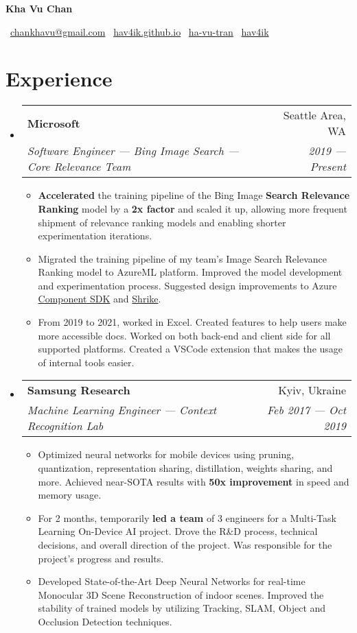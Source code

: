 \documentclass[letterpaper,11pt]{article}
\makeatletter
\newcommand{\resumeItem}[1]{
  \item[--]\small{
    {#1 \vspace{-2pt}}
  }
}
\newcommand{\resumeSubheading}[4]{
  \vspace{-1pt}\item
    \begin{tabular*}{0.97\textwidth}{l@{\extracolsep{\fill}}r}
      \textbf{#1} & #2 \\
      \textit{\small#3} & \textit{\small #4} \\
    \end{tabular*}\vspace{-5pt}
}
\newcommand{\resumeSubHeadingListStart}{\begin{itemize}[leftmargin=*]}
\newcommand{\resumeSubHeadingListEnd}{\end{itemize}}
\newcommand{\resumeItemListStart}{\begin{itemize}[leftmargin=*]}
\newcommand{\resumeItemListEnd}{\end{itemize}\vspace{-5pt}}
\makeatother
\begin{document}


\centerline{\textbf{{\LARGE Kha Vu Chan}}}\medskip
\centerline{
\faEnvelope \, \href{mailto:chankhavu@gmail.com}{chankhavu@gmail.com} \quad
\faLink \, \href{https://hav4ik.github.io/}{hav4ik.github.io} \quad
\faLinkedinSquare \, \href{https://www.linkedin.com/in/ha-vu-tran/}{ha-vu-tran} \quad
\faGithub \, \href{https://github.com/hav4ik}{hav4ik}
}


\section{Experience}
  \resumeSubHeadingListStart

    \resumeSubheading
      {Microsoft}{Seattle Area, WA}
      {Software Engineer --- Bing Image Search --- Core Relevance Team}{2019 --- Present}
      \resumeItemListStart
        \resumeItem{{\bf Accelerated} the training pipeline of the Bing Image {\bf Search Relevance Ranking} model by a {\bf 2x factor} and scaled it up, allowing more frequent shipment of relevance ranking models and enabling shorter experimentation iterations.}
        \resumeItem{Migrated the training pipeline of my team's Image Search Relevance Ranking model to AzureML platform. Improved the model development and experimentation process. Suggested design improvements to Azure \href{https://componentsdk.z22.web.core.windows.net/}{Component SDK} and \href{https://github.com/Azure/shrike}{Shrike}.}
        \resumeItem{From 2019 to 2021, worked in Excel. Created features to help users make more accessible docs. Worked on both back-end and client side for all supported platforms. Created a VSCode extension that makes the usage of internal tools easier.}
      \resumeItemListEnd

    \resumeSubheading
      {Samsung Research}{Kyiv, Ukraine}
      {Machine Learning Engineer --- Context Recognition Lab}{Feb 2017 --- Oct 2019}
      \resumeItemListStart
        \resumeItem
          {Optimized neural networks for mobile devices using pruning, quantization, representation sharing, distillation, weights sharing, and more. Achieved near-SOTA results with {\bf 50x improvement} in speed and memory usage.}
        \resumeItem
          {For 2 months, temporarily {\bf led a team} of 3 engineers for a Multi-Task Learning On-Device AI project. Drove the R\&D process, technical decisions, and overall direction of the project. Was responsible for the project's progress and results.}
        \resumeItem
          {Developed State-of-the-Art Deep Neural Networks for real-time Monocular 3D Scene Reconstruction of indoor scenes. Improved the stability of trained models by utilizing Tracking, SLAM, Object and Occlusion Detection techniques.}
      \resumeItemListEnd
  \resumeSubHeadingListEnd
\end{document}
